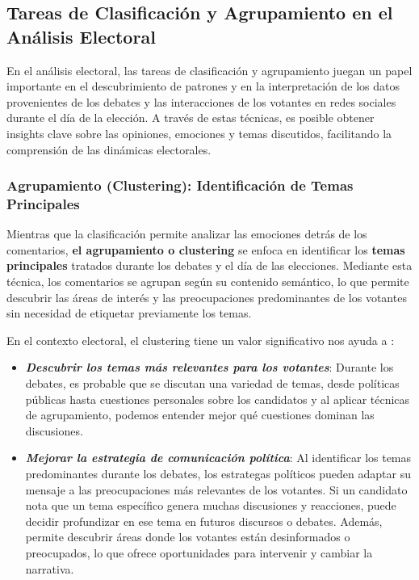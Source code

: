 \documentclass[10pt, a4paper]{article}
\begin{document}
	
	\subsection{Tareas de Clasificación y Agrupamiento en el Análisis Electoral}
	En el análisis electoral, las tareas de clasificación y agrupamiento juegan un papel importante en el descubrimiento de patrones y en la interpretación de los datos provenientes de los debates y las interacciones de los votantes en redes sociales durante el día de la elección. A través de estas técnicas, es posible obtener insights clave sobre las opiniones, emociones y temas discutidos, facilitando la comprensión de las dinámicas electorales.
	
	\subsubsection{Agrupamiento (Clustering): Identificación de Temas Principales}
	Mientras que la clasificación permite analizar las emociones detrás de los comentarios, \textbf{el agrupamiento o clustering} se enfoca en identificar los \textbf{temas principales} tratados durante los debates y el día de las elecciones. Mediante esta técnica, los comentarios se agrupan según su contenido semántico, lo que permite descubrir las áreas de interés y las preocupaciones predominantes de los votantes sin necesidad de etiquetar previamente los temas.
	
	En el contexto electoral, el clustering tiene un valor significativo nos ayuda a :
	
	\begin{itemize}
		\item \textbf{\textit{Descubrir los temas más relevantes para los votantes}}: Durante los debates, es probable que se discutan una variedad de temas, desde políticas públicas hasta cuestiones personales sobre los candidatos y al aplicar técnicas de agrupamiento, podemos entender mejor qué cuestiones dominan las discusiones.
		\item \textbf{\textit{Mejorar la estrategia de comunicación política}}: Al identificar los temas predominantes durante los debates, los estrategas políticos pueden adaptar su mensaje a las preocupaciones más relevantes de los votantes. Si un candidato nota que un tema específico genera muchas discusiones y reacciones, puede decidir profundizar en ese tema en futuros discursos o debates. Además, permite descubrir áreas donde los votantes están desinformados o preocupados, lo que ofrece oportunidades para intervenir y cambiar la narrativa.
	\end{itemize}
	
\end{document}
